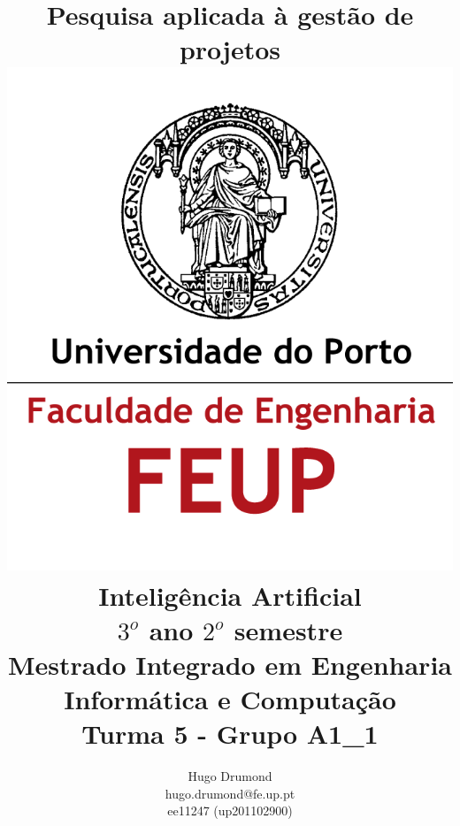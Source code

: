 \documentclass[a4paper,11pt]{article}
\begin{document}
\begin{titlepage}
\title{\huge \textbf{Pesquisa aplicada à gestão de projetos
\\[1cm]\includegraphics{logo.png}\\[1cm] \large Inteligência Artificial\\[0.30cm] \normalsize $3^o$ ano $2^o$ semestre\\[0.05cm]Mestrado Integrado em Engenharia Informática e Computação\\[1cm]\textbf{Turma 5 - Grupo A1\_1}}}

\author{Hugo Drumond\\hugo.drumond@fe.up.pt\\ee11247 (up201102900)\\[1cm]}

\maketitle
\thispagestyle{empty} %

\end{titlepage}

\tableofcontents
\clearpage
\end{document}
